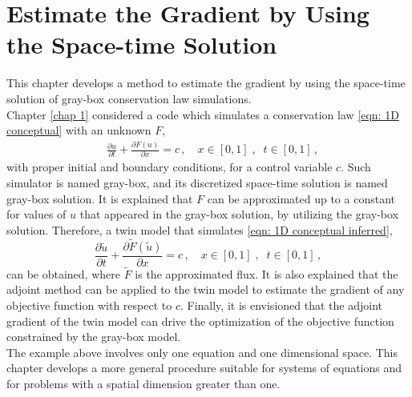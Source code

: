 \chapter{Estimate the Gradient by Using the Space-time Solution}
\label{chapter 2}
This chapter develops a method to estimate the gradient by using the space-time solution
of gray-box conservation law simulations.\\

Chapter \ref{chap 1} considered a code which simulates a conservation law 
\eqref{eqn: 1D conceptual} with an unknown $F$,
\begin{equation*}\begin{split}
    &\frac{\partial u}{\partial t} + \frac{\partial F(u)}{\partial x} = c\,,\quad
    x \in [0,1] \;, \;\; t\in[0,1]\,,
    \label{eqn: 1D conceptual repeat}
\end{split}\end{equation*}
with proper initial and boundary conditions, for a control variable
$c$.
Such simulator is named gray-box, and its discretized space-time solution is named gray-box solution. 
It is explained that $F$ can be approximated up to 
a constant for values of $u$
that appeared in the gray-box solution, by utilizing the gray-box solution.
Therefore, a twin model that simulates \eqref{eqn: 1D conceptual inferred},
\begin{equation*}
    \frac{\partial \tilde{u}}{\partial t} + \frac{\partial \tilde{F}(\tilde{u})}{\partial x} = c\,,\quad
    x \in [0,1] \;, \;\; t\in[0,1]\,,
    \label{eqn: 1D conceptual inferred repeat}
\end{equation*}
can be obtained, where $\tilde{F}$ is the approximated flux. 
It is also explained that the adjoint method can be applied to the twin model to estimate the gradient of 
any objective function with respect to $c$. 
Finally, it is envisioned that the adjoint gradient of the twin model can drive the optimization of 
the objective function constrained by the gray-box model.\\

The example above involves only one equation and one dimensional space.
This chapter develops a more general
procedure suitable for systems of equations and for problems with a spatial dimension greater than one.


